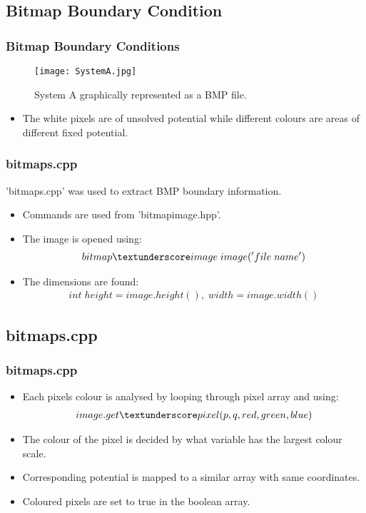 \documentclass{beamer}
\begin{document}
\subsection{Bitmap Boundary Condition}
\begin{frame}
\frametitle{Bitmap Boundary Conditions}
\begin{figure}[H]
	\centering
	\texttt{[image: SystemA.jpg]}
	\caption{System A graphically represented as a BMP file.}
\end{figure}
\begin{itemize}
\item The white pixels are of unsolved potential while different colours are areas of different fixed potential.
\end{itemize}
\end{frame}

\begin{frame}
\frametitle{bitmaps.cpp}
'bitmaps.cpp' was used to extract BMP boundary information.
\begin{itemize}
\item Commands are used from 'bitmap\textunderscore image.hpp'.
\item The image is opened using:\\
\begin{align*}
bitmap\textunderscore image \; image('file \;name')
\end{align*}
\item The dimensions are found:\\
\begin{align*}
int\; height = image.height(),\; width = image.width()
\end{align*}
\end{itemize}
\end{frame}
\begin{frame}
\subsection{bitmaps.cpp}
\frametitle{bitmaps.cpp}
\begin{itemize}
\item Each pixels colour is analysed by looping through pixel array and using:\\
\begin{align*}
image.get\textunderscore pixel(p,q,red,green,blue)
\end{align*}
\item The colour of the pixel is decided by what variable has the largest colour scale.
\item Corresponding potential is mapped to a similar array with same coordinates.
\item Coloured pixels are set to true in the boolean array.
\end{itemize}
\end{frame}
\end{document}
